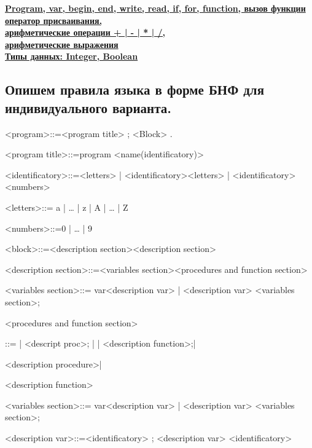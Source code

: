 \documentclass[12pt]{article}
\begin{document}
\textbf{\underline{Program, var, begin, end, write, read, if, for, function, вызов функции}}
\\

\textbf{\underline{оператор присваивания,}}
\\

\textbf{\underline{арифметические операции + | - | * | /,}}
\\

\textbf{\underline{арифметические выражения}}
\\

\textbf{\underline{Типы данных: Integer, Boolean}}
\\

\begin{center}
    \chapter{\textbf{Опишем правила языка в форме БНФ для индивидуального варианта.}}
\end{center}

<program>::=<program title> ; <Block> .

<program title>::=program <name(identificatory)> 

<identificatory>::=<letters>  | <identificatory><letters> | <identificatory><numbers>

<letters>::= a | … | z  | A | … | Z

<numbers>::=0 | … | 9

<block>::=<description section><description section>

<description section>::=<variables section><procedures and function section>

<variables section>::= var<description var>  | <description var> <variables section>;

<procedures and function section>

\qquad\qquad\qquad\qquad\qquad\qquad\qquad               ::=    | <descript proc>;  |  | <description function>;| 

\qquad\qquad\qquad\qquad\qquad\qquad{} <description procedure>| 

\qquad\qquad\qquad\qquad\qquad\qquad{} <description function>            

<variables section>::= var<description var>  | <description var>   <variables section>;

<description var>::=<identificatory> ; <description var>  <identificatory>
\end{document}
